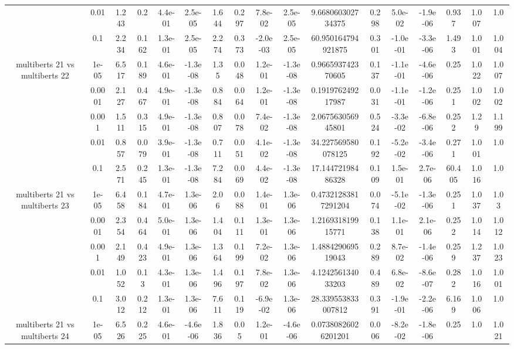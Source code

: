 \begin{tabular}{|c|c|c|c|c|c|c|c|c|c|c|c|c|c|c|c|c|}
 & 0.01 & 1.243 & 0.2 & 4.4e-01 & 2.5e-05 & 1.644 & 0.297 & 7.8e-02 & 2.5e-05 & 9.668060302734375 & 0.298 & 5.0e-02 & -1.9e-06 & 0.937 & 1.007 & 1.0 \\
 & 0.1 & 2.234 & 0.162 & 1.3e-01 & 2.5e-05 & 2.274 & 0.373 & -2.0e-03 & 2.5e-05 & 60.950164794921875 & 0.301 & -1.0e-01 & -3.3e-06 & 1.493 & 1.001 & 1.004 \\
\hline
\multirow{5}{*}{multiberts 21 vs multiberts 22} & 1e-05 & 6.517 & 0.189 & 4.6e-01 & -1.3e-08 & 1.35 & 0.048 & 1.2e-01 & -1.3e-08 & 0.966593742370605 & 0.137 & -1.1e-01 & -4.6e-06 & 0.25 & 1.022 & 1.007 \\
 & 0.0001 & 2.127 & 0.467 & 4.9e-01 & -1.3e-08 & 0.884 & 0.064 & 1.2e-01 & -1.3e-08 & 0.191976249217987 & 0.031 & -1.1e-01 & -1.2e-06 & 0.251 & 1.002 & 1.002 \\
 & 0.001 & 1.511 & 0.315 & 4.9e-01 & -1.3e-08 & 0.807 & 0.078 & 7.4e-02 & -1.3e-08 & 2.067563056945801 & 0.524 & -3.3e-02 & -6.8e-06 & 0.252 & 1.29 & 1.199 \\
 & 0.01 & 0.857 & 0.079 & 3.9e-01 & -1.3e-08 & 0.711 & 0.051 & 4.1e-02 & -1.3e-08 & 34.227569580078125 & 0.192 & -5.2e-02 & -3.4e-06 & 0.271 & 1.001 & 1.0 \\
 & 0.1 & 2.571 & 0.245 & 1.3e-01 & -1.3e-08 & 7.284 & 0.069 & 4.4e-02 & -1.3e-08 & 17.14472198486328 & 0.109 & 1.5e-01 & 2.7e-06 & 60.405 & 1.016 & 1.0 \\
\hline
\multirow{5}{*}{multiberts 21 vs multiberts 23} & 1e-05 & 6.458 & 0.184 & 4.7e-01 & 1.3e-06 & 2.06 & 0.088 & 1.4e-01 & 1.3e-06 & 0.47321283817291204 & 0.074 & -5.1e-02 & -1.3e-06 & 0.251 & 1.037 & 1.03 \\
 & 0.0001 & 2.354 & 0.464 & 5.0e-01 & 1.3e-06 & 1.404 & 0.111 & 1.3e-01 & 1.3e-06 & 1.216931819915771 & 0.138 & 1.1e-01 & 2.1e-06 & 0.252 & 1.014 & 1.012 \\
 & 0.001 & 2.149 & 0.423 & 4.9e-01 & 1.3e-06 & 1.364 & 0.199 & 7.2e-02 & 1.3e-06 & 1.488429069519043 & 0.289 & 8.7e-02 & -1.4e-06 & 0.259 & 1.237 & 1.023 \\
 & 0.01 & 1.052 & 0.13 & 4.3e-01 & 1.3e-06 & 1.496 & 0.197 & 7.8e-02 & 1.3e-06 & 4.124256134033203 & 0.489 & 6.8e-02 & -8.6e-07 & 0.282 & 1.016 & 1.001 \\
 & 0.1 & 3.012 & 0.212 & 1.3e-01 & 1.3e-06 & 7.611 & 0.119 & -6.9e-02 & 1.3e-06 & 28.339553833007812 & 0.391 & -1.9e-01 & -2.2e-06 & 6.169 & 1.006 & 1.0 \\
\hline
\multirow{5}{*}{multiberts 21 vs multiberts 24} & 1e-05 & 6.526 & 0.225 & 4.6e-01 & -4.6e-06 & 1.836 & 0.05 & 1.2e-01 & -4.6e-06 & 0.07380826026201201 & 0.006 & -8.2e-02 & -1.8e-06 & 0.25 & 1.0 & 1.021 \\

\end{tabular}
